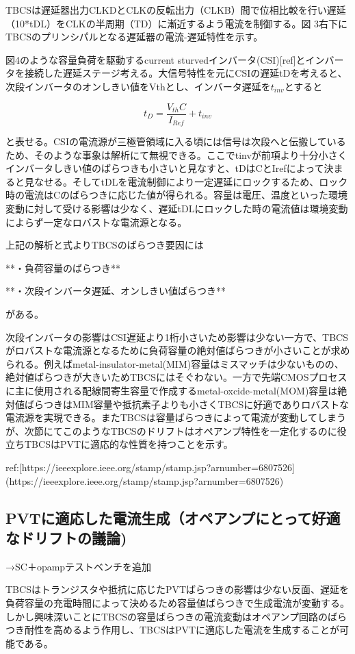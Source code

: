 \documentclass[letterpaper, 10 pt, conference]{ieeeconf}  %
\begin{document}
TBCSは遅延器出力CLKDとCLKの反転出力（CLKB）間で位相比較を行い遅延（10*tDL）をCLKの半周期（TD）に漸近するよう電流を制御する。図 3右下にTBCSのプリンシパルとなる遅延器の電流-遅延特性を示す。

図4のような容量負荷を駆動するcurrent sturvedインバータ(CSI)[ref]とインバータを接続した遅延ステージ考える。大信号特性を元にCSIの遅延tDを考えると、次段インバータのオンしきい値をVthとし、インバータ遅延を$t_{inv}$とすると

$$t_D = \frac{V_{th}C}{I_{Ref}}+t_{inv}$$

と表せる。CSIの電流源が三極管領域に入る頃には信号は次段へと伝搬しているため、そのような事象は解析にて無視できる。ここでtinvが前項より十分小さくインバータしきい値のばらつきも小さいと見なすと、tDはCとIrefによって決まると見なせる。そしてtDLを電流制御により一定遅延にロックするため、ロック時の電流はCのばらつきに応じた値が得られる。容量は電圧、温度といった環境変動に対して受ける影響は少なく、遅延tDLにロックした時の電流値は環境変動によらず一定なロバストな電流源となる。

上記の解析と式よりTBCSのばらつき要因には

**・負荷容量のばらつき**

**・次段インバータ遅延、オンしきい値ばらつき**

がある。

次段インバータの影響はCSI遅延より1桁小さいため影響は少ない一方で、TBCSがロバストな電流源となるために負荷容量の絶対値ばらつきが小さいことが求められる。例えばmetal-insulator-metal(MIM)容量はミスマッチは少ないものの、絶対値ばらつきが大きいためTBCSにはそぐわない。一方で先端CMOSプロセスに主に使用される配線間寄生容量で作成するmetal-oxcide-metal(MOM)容量は絶対値ばらつきはMIM容量や抵抗素子よりも小さくTBCSに好適でありロバストな電流源を実現できる。またTBCSは容量ばらつきによって電流が変動してしまうが、次節にてこのようなTBCSのドリフトはオペアンプ特性を一定化するのに役立ちTBCSはPVTに適応的な性質を持つことを示す。

ref:[https://ieeexplore.ieee.org/stamp/stamp.jsp?arnumber=6807526](https://ieeexplore.ieee.org/stamp/stamp.jsp?arnumber=6807526)

\subsection{PVTに適応した電流生成（オペアンプにとって好適なドリフトの議論)}
→SC＋opampテストベンチを追加

TBCSはトランジスタや抵抗に応じたPVTばらつきの影響は少ない反面、遅延を負荷容量の充電時間によって決めるため容量値ばらつきで生成電流が変動する。しかし興味深いことにTBCSの容量ばらつきの電流変動はオペアンプ回路のばらつき耐性を高めるよう作用し、TBCSはPVTに適応した電流を生成することが可能である。
\end{document}
